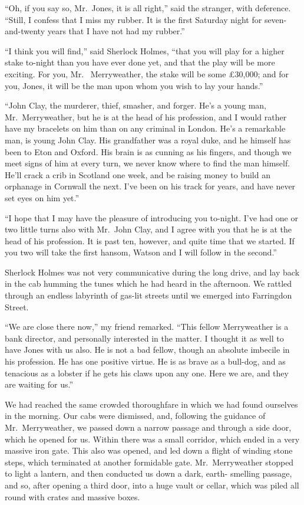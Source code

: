 “Oh, if you say so, Mr.~Jones, it is all right,” said the
stranger, with deference. “Still, I confess that I miss my
rubber. It is the first Saturday night for seven-and-twenty
years that I have not had my rubber.”

“I think you will find,” said Sherlock Holmes, “that you
will play for a higher stake to-night than you have ever done
yet, and that the play will be more exciting. For you, Mr.\ %
Merryweather, the stake will be some £30,000; and for you,
Jones, it will be the man upon whom you wish to lay your
hands.”

“John Clay, the murderer, thief, smasher, and forger. He’s
a young man, Mr.~Merryweather, but he is at the head of his
profession, and I would rather have my bracelets on him than
on any criminal in London. He’s a remarkable man, is young
John Clay. His grandfather was a royal duke, and he himself
has been to Eton and Oxford. His brain is as cunning
as his fingers, and though we meet signs of him at every turn,
we never know where to find the man himself. He’ll crack a
crib in Scotland one week, and be raising money to build an
orphanage in Cornwall the next. I’ve been on his track for
years, and have never set eyes on him yet.”

“I hope that I may have the pleasure of introducing you
to-night. I’ve had one or two little turns also with Mr.~John
Clay, and I agree with you that he is at the head of his profession.
It is past ten, however, and quite time that we started.
If you two will take the first hansom, Watson and I will
follow in the second.”

Sherlock Holmes was not very communicative during the
long drive, and lay back in the cab humming the tunes which
he had heard in the afternoon. We rattled through an endless
labyrinth of gas-lit streets until we emerged into
Farringdon Street.

“We are close there now,” my friend remarked. “This fellow
Merryweather is a bank director, and personally interested
in the matter. I thought it as well to have Jones with us
also. He is not a bad fellow, though an absolute imbecile in
his profession. He has one positive virtue. He is as brave
as a bull-dog, and as tenacious as a lobster if he gets his
claws upon any one. Here we are, and they are waiting for
us.”

We had reached the same crowded thoroughfare in which
we had found ourselves in the morning. Our cabs were dismissed,
and, following the guidance of Mr.~Merryweather, we
passed down a narrow passage and through a side door, which
he opened for us. Within there was a small corridor, which
ended in a very massive iron gate. This also was opened,
and led down a flight of winding stone steps, which terminated
at another formidable gate. Mr.~Merryweather stopped
to light a lantern, and then conducted us down a dark, earth-%
smelling passage, and so, after opening a third door, into a
huge vault or cellar, which was piled all round with crates and
massive boxes.

